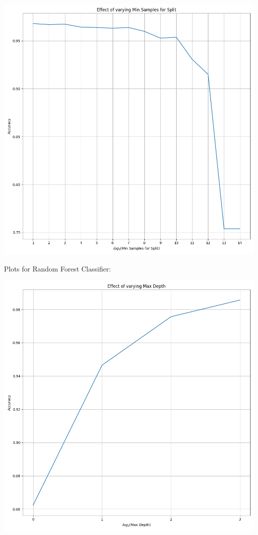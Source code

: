 \documentclass[12pt, letterpaper]{article}
\begin{document}
\includegraphics[scale=\myscale]{decision_tree_classifier_Min Samples for Split.png}

Plots for Random Forest Classifier:

\includegraphics[scale=\myscale]{random_forest_classifier_Max Depth.png}
\end{document}
